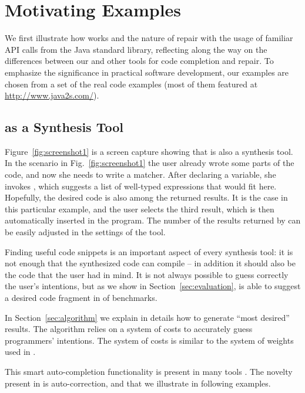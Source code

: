 \section{Motivating Examples}
\label{sec:examples}

We first illustrate how \ourTool works and the nature of repair with the usage of
familiar API calls from the Java standard library, reflecting along the way on the differences between our and other tools for code completion and repair. To emphasize the significance in practical software development, 
our examples are chosen from a set of the real code examples (most of them featured at
\url{http://www.java2s.com/}{}).

\subsection{\ourTool as a Synthesis Tool}

Figure~\ref{fig:screenshot1} is a screen capture showing that \ourTool is also
a synthesis tool. In the scenario in Fig.~\ref{fig:screenshot1} the user already wrote some parts of the code, and now she 
needs to write a matcher. After declaring a variable,
she invokes \ourTool, which suggests a list of well-typed expressions that would fit here. Hopefully, the desired code is also among the returned results. It is the case in this particular example, and the user selects the third 
result, which is then automatically inserted in the program. The number of the results returned by \ourTool can be easily adjusted in the settings of the tool. 

Finding useful code snippets is an important aspect of every synthesis tool: it is not enough that 
the synthesized code can compile -- in addition it should also be the code that the user had in mind. It is not always possible to guess correctly the user's intentions, but as we show in Section~\ref{sec:evaluation}, \ourTool is able to suggest a desired code fragment in  of benchmarks.

In Section~\ref{sec:algorithm} we explain in details how to generate ``most desired'' results. The \ourTool algorithm relies on a system of costs to accurately guess 
programmers' intentions. The system of costs is similar to the system of weights used 
in \cite{GveroETAL13CompleteCompletionTypesWeights}.

This smart auto-completion functionality is present in many tools \cite{MandelinetALL2005Jungloid, GveroETAL13CompleteCompletionTypesWeights, PerelmanGBG12}. 
The novelty present in \ourTool is auto-correction, and that we illustrate in following examples.


